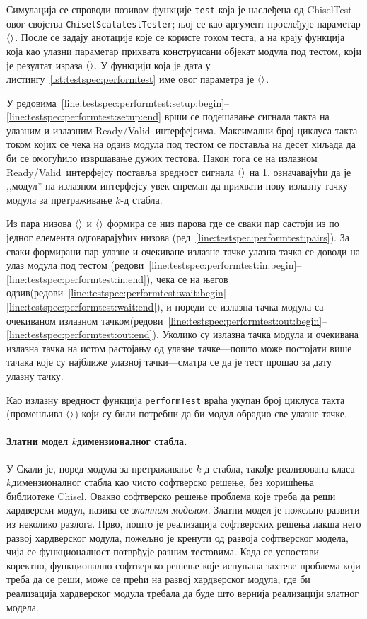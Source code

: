 \documentclass[master]{finthesis}
\newcommand*{\kdim}[1]{\texorpdfstring{$k$\Hyphdash}{k-}димензионал#1}
\newcommand*{\kd}{\texorpdfstring{$k$}{k}-д }
\newcommand*{\correctmath}[1]{%
    \ifcsname mathCorrectionFor#1\endcsname%
        \csname mathCorrectionFor#1\endcsname%
    \else%
        #1%
    \fi%
}
\newcommand*{\mfield}[1]{{\langle\correctmath{#1}\/\rangle}}
\newcommand*{\field}[1]{\texorpdfstring{$\mfield{#1}$}{⟨#1⟩}}
\newcommand{\rv}{Ready\slash Valid}
\newcommand*{\prog}[1]{\texttt{#1}}
\newcommand*{\func}[1]{\prog{#1}}
\begin{document}
Симулација се спроводи позивом функције \func{test} која је наслеђена од ChiselTest-овог својства \prog{ChiselScalatestTester}; њој се као аргумент прослеђује параметар \field{module}. После се задају анотације које се користе током теста, а на крају функција која као улазни параметар прихвата конструисани објекат модула под тестом, који је резултат израза \field{module}. У функцији која је дата у листингу~\ref{lst:testspec:performtest} име овог параметра је \field{dut}.

У редовима~\ref{line:testspec:performtest:setup:begin}--\ref{line:testspec:performtest:setup:end} врши се подешавање сигнала такта на улазним и излазним \rv\ интерфејсима. Максимални број циклуса такта током којих се чека на одзив модула под тестом се поставља на десет хиљада да би се омогућило извршавање дужих тестова. Након тога се на излазном \rv\ интерфејсу поставља вредност сигнала \field{ready} на 1, означавајући да је ,,модул'' на излазном интерфејсу увек спреман да прихвати нову излазну тачку модула за претраживање \kd стабла.

Из пара низова \field{queryPoints} и \field{expectedOutPoints} формира се низ парова где се сваки пар састоји из по једног елемента одговарајућих низова (ред~\ref{line:testspec:performtest:pairs}). За сваки формирани пар улазне и очекиване излазне тачке улазна тачка се доводи на улаз модула под тестом (редови~\ref{line:testspec:performtest:in:begin}--\ref{line:testspec:performtest:in:end}), чека се на његов одзив(редови~\ref{line:testspec:performtest:wait:begin}--\ref{line:testspec:performtest:wait:end}), и пореди се излазна тачка модула са очекиваном излазном тачком(редови~\ref{line:testspec:performtest:out:begin}--\ref{line:testspec:performtest:out:end}). Уколико су излазна тачка модула и очекивана излазна тачка на истом растојању од улазне тачке---пошто може постојати више тачака које су најближе улазној тачки---сматра се да је тест прошао за дату улазну тачку.

Као излазну вредност функција \func{performTest} враћа укупан број циклуса такта (променљива \field{elapsedClockCycles}) који су били потребни да би модул обрадио све улазне тачке.

\paragraph{Златни модел \kdim{ног} стабла.} У Скали је, поред модула за претраживање \kd стабла, такође реализована класа \kdim{ног} стабла као чисто софтверско решење, без коришћења библиотеке Chisel. Овакво софтверско решење проблема које треба да реши хардверски модул, назива се \emph{златним моделом}. Златни модел је пожељно развити из неколико разлога. Прво, пошто је реализација софтверских решења лакша него развој хардверског модула, пожељно је кренути од развоја софтверског модела, чија се функционалност потврђује разним тестовима. Када се успостави коректно, функционално софтверско решење које испуњава захтеве проблема који треба да се реши, може се прећи на развој хардверског модула, где би реализација хардверског модула требала да буде што вернија реализацији златног модела.
\end{document}

